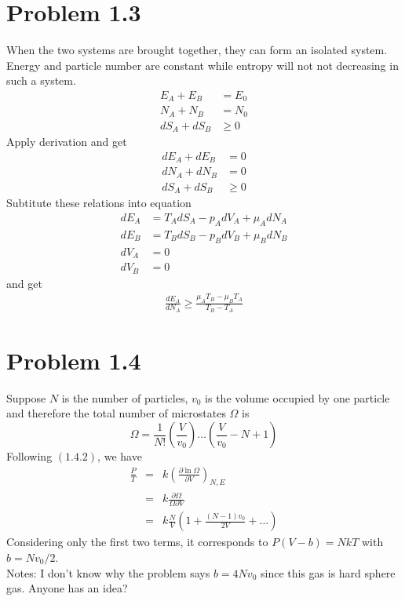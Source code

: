 \documentclass{article}
\begin{document}
\section*{Problem 1.3}
When the two systems are brought together, they can form an isolated system. Energy and particle number are constant while entropy will not not decreasing in such a system.\\
\begin{align}
E_A+E_B&=E_0\\
N_A+N_B&=N_0\\
dS_A+dS_B&\geq0
\end{align}
Apply derivation and get
\begin{align}
dE_A+dE_B&=0\\
dN_A+dN_B&=0\\
dS_A+dS_B&\geq0
\end{align}
Subtitute these relations into equation
\begin{align}
dE_A&=T_AdS_A-p_AdV_A+\mu_A dN_A\\
dE_B&=T_BdS_B-p_BdV_B+\mu_B dN_B\\
dV_A&=0\\
dV_B&=0
\end{align}
and get
\begin{align}
\frac{dE_A}{dN_A}\geq\frac{\mu_A T_B-\mu_B T_A}{T_B-T_A}
\end{align}

\section*{Problem 1.4}
Suppose $N$ is the number of particles, $v_{0}$ is the volume occupied by one particle and therefore the total number of microstates $\Omega$ is
\begin{equation}
\Omega = \frac{1}{N!}(\frac{V}{v_{0}}) \dots (\frac{V}{v_{0}}-N+1)
\end{equation}
Following $(1.4.2)$, we have
\begin{eqnarray}
\frac{P}{T} &=& k \left(\frac{\partial \ln \Omega}{\partial V}\right)_{N,E} \\
&=& k \frac{\partial \Omega}{\Omega \partial V} \\
&=& k \frac{N}{V} \left(1+ \frac{(N-1)v_{0}}{2V} + \dots \right)
\end{eqnarray}
Considering only the first two terms, it corresponds to $P(V-b) = NkT$ with $b=N v_{0}/2$. \\
Notes: I don't know why the problem says $b=4N v_{0}$ since this gas is hard sphere gas. Anyone has an idea?
\end{document}

